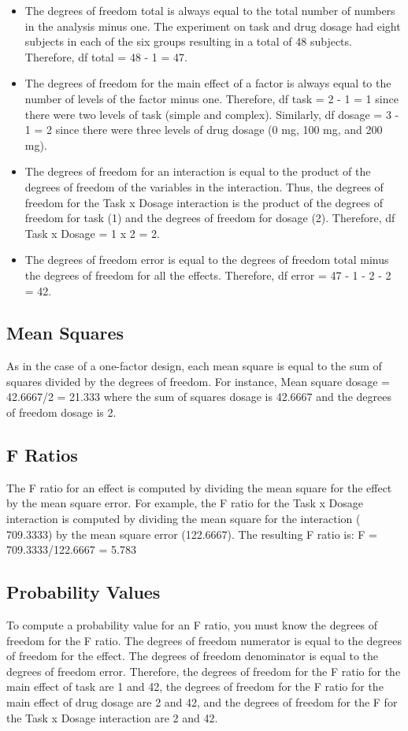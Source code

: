 \begin{itemize}
	\item The degrees of freedom total is always equal to the total number of numbers in the analysis minus one. The experiment on task and drug dosage had eight subjects in each of the six groups resulting in a total of 48 subjects. Therefore, df total = 48 - 1 = 47.
	
	\item The degrees of freedom for the main effect of a factor is always equal to the number of levels of the factor minus one. Therefore, df task = 2 - 1 = 1 since there were two levels of task (simple and complex). Similarly, df dosage = 3 - 1 = 2 since there were three levels of drug dosage (0 mg, 100 mg, and 200 mg).
	
	\item The degrees of freedom for an interaction is equal to the product of the degrees of freedom of the variables in the interaction. Thus, the degrees of freedom for the Task x Dosage interaction is the product of the degrees of freedom for task (1) and the degrees of freedom for dosage (2). Therefore, df Task x Dosage = 1 x 2 = 2.
	
	\item The degrees of freedom error is equal to the degrees of freedom total minus the degrees of freedom for all the effects. Therefore, df error = 47 - 1 - 2 - 2 = 42.
\end{itemize}

\subsection{Mean Squares}
As in the case of a one-factor design, each mean square is equal to the sum of squares divided by the degrees of freedom. For instance, Mean square dosage = 42.6667/2 = 21.333 where the sum of squares dosage is 42.6667 and the degrees of freedom dosage is 2.


\subsection{F Ratios}
The F ratio for an effect is computed by dividing the mean square for the effect by the mean square error. For example, the F ratio for the Task x Dosage interaction is computed by dividing the mean square for the interaction ( 709.3333) by the mean square error (122.6667). The resulting F ratio is: F = 709.3333/122.6667 = 5.783


\subsection{Probability Values}
To compute a probability value for an F ratio, you must know the degrees of freedom for the F ratio. The degrees of freedom numerator is equal to the degrees of freedom for the effect. The degrees of freedom denominator is equal to the degrees of freedom error. Therefore, the degrees of freedom for the F ratio for the main effect of task are 1 and 42, the degrees of freedom for the F ratio for the main effect of drug dosage are 2 and 42, and the degrees of freedom for the F for the Task x Dosage interaction are 2 and 42.

